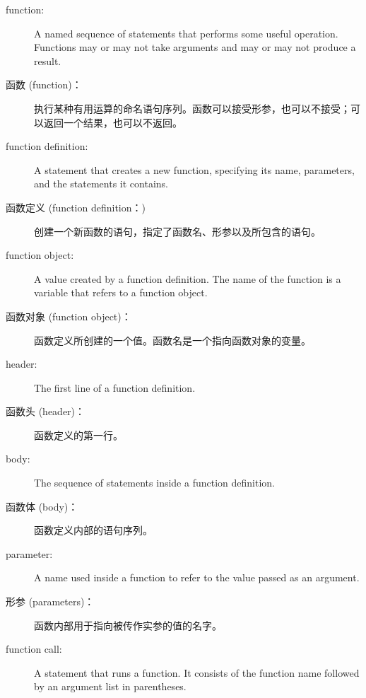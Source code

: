 \begin{description}

\item[function:] A named sequence of statements that performs some
useful operation.  Functions may or may not take arguments and may or
may not produce a result.

\item[函数 (function)：] 执行某种有用运算的命名语句序列。函数可以接受形参，也可以不接受；可以返回一个结果，也可以不返回。

\item[function definition:]  A statement that creates a new function,
specifying its name, parameters, and the statements it contains.

\item[函数定义 (function definition：)] 创建一个新函数的语句，指定了函数名、形参以及所包含的语句。

\item[function object:]  A value created by a function definition.
The name of the function is a variable that refers to a function
object.

\item[函数对象 (function object)：] 函数定义所创建的一个值。函数名是一个指向函数对象的变量。


\item[header:] The first line of a function definition.

\item[函数头 (header)：] 函数定义的第一行。

\item[body:] The sequence of statements inside a function definition.

\item[函数体 (body)：] 函数定义内部的语句序列。

\item[parameter:] A name used inside a function to refer to the value
passed as an argument.

\item[形参 (parameters)：] 函数内部用于指向被传作实参的值的名字。

\item[function call:] A statement that runs a function. It
consists of the function name followed by an argument list in
parentheses.


\end{description}
